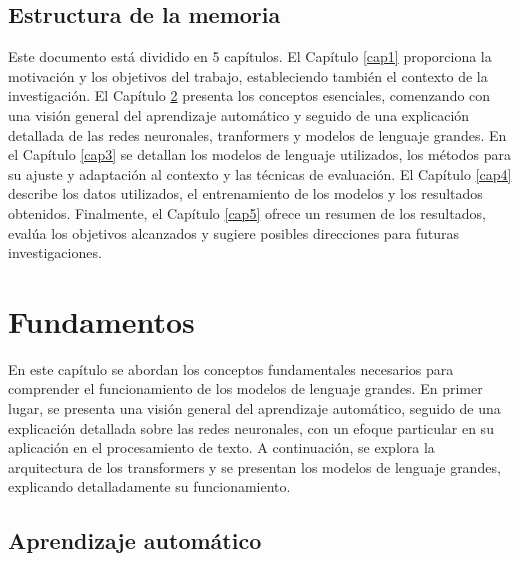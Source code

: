 \documentclass[11pt,spanish,listoffigures,listoftables]{tfgetsinf}
\begin{document}
\section{Estructura de la memoria}

Este documento está dividido en 5 capítulos. El Capítulo \ref{cap1} proporciona la motivación y los objetivos del trabajo, estableciendo también el contexto de la investigación. El Capítulo \ref{cap2} presenta los conceptos esenciales, comenzando con una visión general del aprendizaje automático y seguido de una explicación detallada de las redes neuronales, tranformers y modelos de lenguaje grandes. En el Capítulo \ref{cap3} se detallan los modelos de lenguaje utilizados, los métodos para su ajuste y adaptación al contexto y las técnicas de evaluación. El Capítulo \ref{cap4} describe los datos utilizados, el entrenamiento de los modelos y los resultados obtenidos. Finalmente, el Capítulo \ref{cap5} ofrece un resumen de los resultados, evalúa los objetivos alcanzados y sugiere posibles direcciones para futuras investigaciones.




\chapter{Fundamentos}\label{cap2}

En este capítulo se abordan los conceptos fundamentales necesarios para comprender el funcionamiento de los modelos de lenguaje grandes. En primer lugar, se presenta una visión general del aprendizaje automático, seguido de una explicación detallada sobre las redes neuronales, con un efoque particular en su aplicación en el procesamiento de texto. A continuación, se explora la arquitectura de los transformers y se presentan los modelos de lenguaje grandes, explicando detalladamente su funcionamiento.

\section{Aprendizaje automático}
\end{document}
